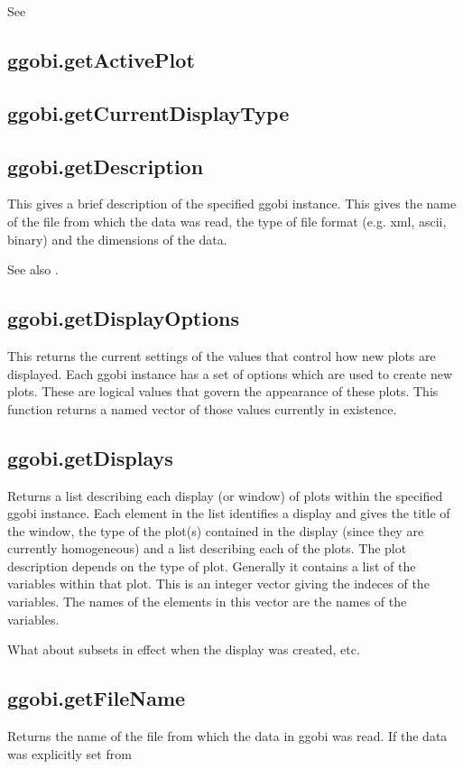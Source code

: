 \documentclass{article}
\begin{document}
See 

\subsection{ggobi.getActivePlot}
\subsection{ggobi.getCurrentDisplayType}
\subsection{ggobi.getDescription}
This gives a brief description of the specified ggobi instance.  This
gives the name of the file from which the data was read, the type of
file format (e.g. xml, ascii, binary) and the dimensions of the data.

See also .

\subsection{ggobi.getDisplayOptions}
This returns the current settings of the values that control how new
plots are displayed.  Each ggobi instance has a set of options which
are used to create new plots.  These are logical values that govern
the appearance of these plots.  This function returns a named vector
of those values currently in existence.



\subsection{ggobi.getDisplays}
Returns a list describing each display (or window) of plots within the
specified ggobi instance.  Each element in the list identifies a
display and gives the title of the window, the type of the plot(s)
contained in the display (since they are currently homogeneous) and a
list describing each of the plots.  The plot description depends on
the type of plot. Generally it contains a list of the variables within
that plot.  This is an integer vector giving the indeces of the
variables. The names of the elements in this vector are the names of
the variables. 


What about subsets in effect when the display was
created, etc.

\subsection{ggobi.getFileName}
Returns the name of the file
from which the data in ggobi
was read. If the data was explicitly
set from 
\end{document}
